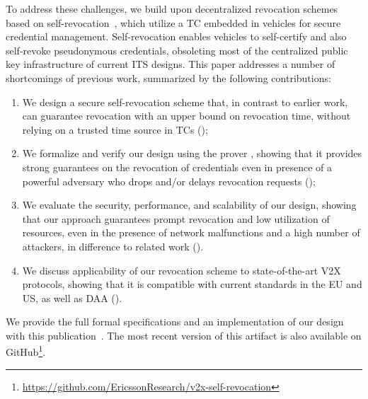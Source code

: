 To address these challenges, we build upon decentralized revocation schemes
based on
self-revocation~\cite{whitefield2017privacy,desmoulins2019practical,larsen2021daa},
which utilize a \ac{TC} embedded in vehicles for secure credential management.
Self-revocation enables vehicles to self-certify and also self-revoke
pseudonymous credentials, obsoleting most of the centralized public key
infrastructure of current \ac{ITS} designs. This paper addresses a number of
shortcomings of previous work, summarized by the following contributions:
%
\begin{enumerate}
%
    \item We design a secure self-revocation scheme that, in contrast to earlier
work, can guarantee revocation with an upper bound on revocation time, without
relying on a trusted time source in \acp{TC} ();
%
    \item We formalize and verify our design using the \tamarin{} prover
\cite{meier2013tamarin}, showing that it provides strong guarantees on the
revocation of credentials even in presence of a powerful adversary who drops
and/or delays revocation requests ();
%
    \item We evaluate the security, performance, and scalability of our design,
showing that our approach guarantees prompt revocation and low utilization
of %
resources, even in the presence of network malfunctions and a high number of
attackers, in difference to related work
().
%
    \item We discuss applicability of our revocation scheme to state-of-the-art
    \ac{V2X} protocols, showing that it is compatible with current standards in
    the EU and US, as well as \ac{DAA}
    ().
\end{enumerate}
%
We provide the full formal specifications and an implementation of our design with this
publication~\cite{supplMaterial}. 
The most recent version of this artifact is also available on 
GitHub\footnote{\url{https://github.com/EricssonResearch/v2x-self-revocation}}.
